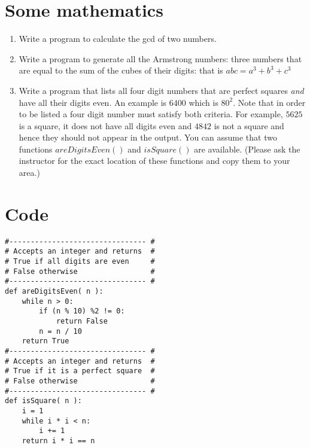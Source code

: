 \documentclass[11pt]{article}
\begin{document}
\section{Some mathematics}
\begin{enumerate}
    \item Write a program to calculate the gcd of two numbers.
    \item Write a program to generate all the Armstrong numbers: three numbers that are equal to the sum of the cubes of
        their digits: that is $abc = a^3 + b^3 + c^3$
    \item Write a program that lists all four digit numbers that are perfect squares \emph{and} have all their digits
        even. An example is $6400$ which is $80^2$. Note that in order to be listed a four digit number must satisfy
        both criteria. For example, $5625$ is a square, it does not have all digits even and
        $4842$ is not a square and hence they should not appear in the output. You can assume that two functions
        $areDigitsEven()$ and $isSquare()$ are available. (Please ask the instructor for the exact location of these
        functions and copy them to your area.)
\end{enumerate}
\section{Code}
\begin{verbatim}
#-------------------------------- #
# Accepts an integer and returns  #
# True if all digits are even     #
# False otherwise                 #
#-------------------------------- #
def areDigitsEven( n ):
    while n > 0:
        if (n % 10) %2 != 0:
            return False
        n = n / 10
    return True
#-------------------------------- #
# Accepts an integer and returns  #
# True if it is a perfect square  #
# False otherwise                 #
#-------------------------------- #
def isSquare( n ):
    i = 1
    while i * i < n:
        i += 1
    return i * i == n
    
\end{verbatim}
\end{document}
